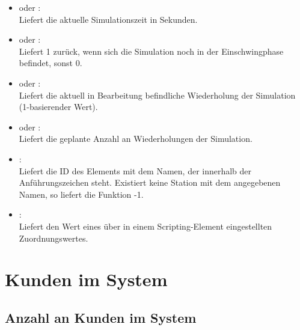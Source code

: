 \begin{itemize}

\item
{} oder :\\
Liefert die aktuelle Simulationszeit in Sekunden.

\item
{} oder :\\
Liefert 1 zurück, wenn sich die Simulation noch in der Einschwingphase befindet, sonst 0.

\item
{} oder :\\
Liefert die aktuell in Bearbeitung befindliche Wiederholung der Simulation (1-basierender Wert).

\item
{} oder :\\
Liefert die geplante Anzahl an Wiederholungen der Simulation.

\item
{}:\\
Liefert die ID des Elements mit dem Namen, der innerhalb der Anführungszeichen steht.
Existiert keine Station mit dem angegebenen Namen, so liefert die Funktion -1.

\item
{}:\\
Liefert den Wert eines über  in einem Scripting-Element eingestellten Zuordnungswertes.

\end{itemize}





\section{Kunden im System}



\subsection{Anzahl an Kunden im System}

